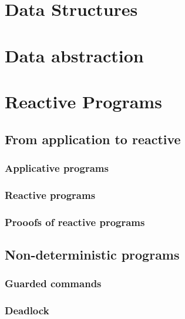 \documentclass[12pt, a4paper]{book}
\begin{document}
  \section{Data Structures}
  \label{sec:Data Structures}

  \section{Data abstraction}
  \label{sec:Data abstraction}


  \section{Reactive Programs}
  \label{sec:Reactive Programs}
  \subsection{From application to reactive}
  \label{sub:From application to reactive}
  \subsubsection{Applicative programs}
  \label{subs:Applicative programs}
  \subsubsection{Reactive programs}
  \label{subs:Reactive programs}
  \subsubsection{Prooofs of reactive programs}
  \label{subs:Prooofs of reactive programs}
  \subsection{Non-deterministic programs}
  \label{sub:Non-deterministic programs}
  \subsubsection{Guarded commands}
  \label{subs:Guarded commands}
  \subsubsection{Deadlock}
  \label{subs:Deadlock}
\end{document}
